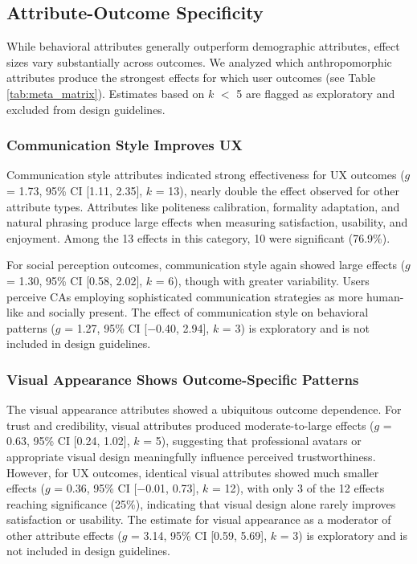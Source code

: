 \documentclass[lettersize,journal]{IEEEtran}
\begin{document}
\subsection{Attribute-Outcome Specificity}

While behavioral attributes generally outperform demographic attributes, effect sizes vary substantially across outcomes. We analyzed which anthropomorphic attributes produce the strongest effects for which user outcomes (see Table \ref{tab:meta_matrix}). Estimates based on $k$ $<$ 5 are flagged as exploratory and excluded from design guidelines.

\subsubsection{Communication Style Improves UX}\label{sec:comm}

Communication style attributes indicated strong effectiveness for UX outcomes ($g$ = 1.73, 95\% CI [1.11, 2.35], $k$ = 13), nearly double the effect observed for other attribute types. Attributes like politeness calibration, formality adaptation, and natural phrasing produce large effects when measuring satisfaction, usability, and enjoyment. Among the 13 effects in this category, 10 were significant (76.9\%).

For social perception outcomes, communication style again showed large effects ($g$ = 1.30, 95\% CI [0.58, 2.02], $k$ = 6), though with greater variability. Users perceive CAs employing sophisticated communication strategies as more human-like and socially present. The effect of communication style on behavioral patterns ($g$ = 1.27, 95\% CI [$-$0.40, 2.94], $k$ = 3) is exploratory and is not included in design guidelines.

\subsubsection{Visual Appearance Shows Outcome-Specific Patterns}

The visual appearance attributes showed a ubiquitous outcome dependence. For trust and credibility, visual attributes produced moderate-to-large effects ($g$ = 0.63, 95\% CI [0.24, 1.02], $k$ = 5), suggesting that professional avatars or appropriate visual design meaningfully influence perceived trustworthiness. However, for UX outcomes, identical visual attributes showed much smaller effects ($g$ = 0.36, 95\% CI [$-$0.01, 0.73], $k$ = 12), with only 3 of the 12 effects reaching significance (25\%), indicating that visual design alone rarely improves satisfaction or usability. The estimate for visual appearance as a moderator of other attribute effects ($g$ = 3.14, 95\% CI [0.59, 5.69], $k$ = 3) is exploratory and is not included in design guidelines.
\end{document}
